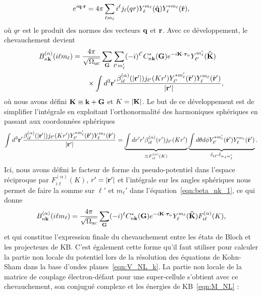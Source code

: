 \begin{equation}
    e^{i\mathbf{q}\cdot\mathbf{r}} = 4\pi \sum_{\ell m_\ell}i^\ell j_\ell (qr)Y_\ell^{m_\ell}(\hat{\mathbf{q}})Y_\ell^{*m_\ell}(\hat{\mathbf{r}}),
\end{equation}
où $qr$ est le produit des normes des vecteurs $\mathbf{q}$ et $\mathbf{r}$. Avec ce développement, le chevauchement devient
\begin{align}
    B_{n\mathbf{k}}^{(\alpha)}(i\ell m_\ell) &=\frac{4\pi}{\sqrt{\Omega_\text{uc}}}\sum_{\mathbf{G}}\sum_{\ell'm_\ell'}(-i)^{\ell'}C^*_{n\mathbf{k}}(\mathbf{G})e^{-i\mathbf{K}\cdot\bm{\tau}_\alpha}Y_{\ell'}^{m_\ell'}(\widehat{\mathbf{K}})\notag\\
    &\qquad\times\int d^3\mathbf{r}'\frac{\beta_{i\ell}^{(\alpha)}(|\mathbf{r}'|)j_{\ell'}(Kr')Y_{\ell'}^{*m_\ell'}(\hat{\mathbf{r}}')Y_{\ell}^{m_\ell}(\hat{\mathbf{r}}')}{|\mathbf{r}'|},\label{eqn:beta_nk_1}
\end{align}
où nous avons défini $\mathbf{K}\equiv\mathbf{k}+\mathbf{G}$ et $K=|\mathbf{K}|$. Le but de ce développement est de simplifier l'intégrale en exploitant l'orthonormalité des harmoniques sphériques en passant aux coordonnées sphériques
\begin{equation}
    \int d^3\mathbf{r}'\frac{\beta_{i\ell}^{(\alpha)}(|\mathbf{r}'|)j_{\ell'}(Kr')Y_{\ell'}^{*m_\ell'}(\hat{\mathbf{r}}')Y_{\ell}^{m_\ell}(\hat{\mathbf{r}}')}{|\mathbf{r}'|} = \underbrace{\int dr' r' \beta_{i\ell}^{(\alpha)}(r')j_{\ell'}(Kr')}_{\equiv F_{i\ell}^{(\alpha)}(K)}\underbrace{\int d\theta d\phi Y_{\ell'}^{*m_\ell'}(\hat{\mathbf{r}}')Y_\ell^{m_\ell}(\hat{\mathbf{r}}')}_{\delta_{\ell\ell'}\delta_{m_\ell m_\ell'}}.
\end{equation}
Ici, nous avons défini le facteur de forme du pseudo-potentiel dans l'espace réciproque par $F_{i\ell}^{(\alpha)}(K)$, $r'=|\mathbf{r}'|$ et l'intégrale sur les angles sphériques nous permet de faire la somme sur $\ell'$ et $m_\ell'$ dans l'équation~\eqref{eqn:beta_nk_1}, ce qui donne
\begin{equation}
    B_{n\mathbf{k}}^{(\alpha)}(i\ell m_\ell) =\frac{4\pi}{\sqrt{\Omega_\text{uc}}}\sum_{\mathbf{G}}(-i)^\ell C_{n\mathbf{k}}^*(\mathbf{G})e^{-i\mathbf{K}\cdot\bm{\tau}_\alpha}Y_\ell^{m_\ell}(\widehat{\mathbf{K}})F_{i\ell}^{(\alpha)}(K),
\end{equation}
et qui constitue l'expression finale du chevauchement entre les états de Bloch et les projecteurs de KB. C'est également cette forme qu'il faut utiliser pour calculer la partie non locale du potentiel lors de la résolution des équations de Kohn-Sham dans la base d'ondes planes~\eqref{eqn:V_NL_k}. La partie non locale de la matrice de couplage électron-défaut pour une super-cellule s'obtient avec ce chevauchement, son conjugué complexe et les énergies de KB~\eqref{eqn:M_NL} :
